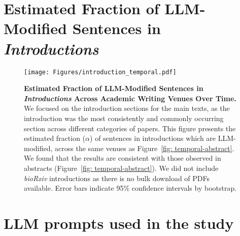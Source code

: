 \documentclass{article}
\renewcommand{\a}{\alpha}
\begin{document}
 












\appendix

\clearpage
\newpage 









\clearpage

\section{Estimated Fraction of LLM-Modified Sentences in \textit{Introductions}}


\begin{figure}[ht!] 
    \centering
    \texttt{[image: Figures/introduction\_temporal.pdf]}
    \caption{
    \textbf{Estimated Fraction of LLM-Modified Sentences in \textit{Introductions} Across Academic Writing Venues Over Time. }
    We focused on the introduction sections for the main texts, as the introduction was the most consistently and commonly occurring section across different categories of papers.
    This figure presents the estimated fraction ($\a$) of sentences in introductions which are LLM-modified, across the same venues as Figure~\ref{fig: temporal-abstract}. 
    We found that the results are consistent with those observed in abstracts (Figure~\ref{fig: temporal-abstract}). 
    We did not include \textit{bioRxiv} introductions as there is no bulk download of PDFs available.
    Error bars indicate 95\% confidence intervals by bootstrap.
    }
    \label{fig: temporal-introduction}
\end{figure}

\clearpage
 


\section{LLM prompts used in the study}
\end{document}
